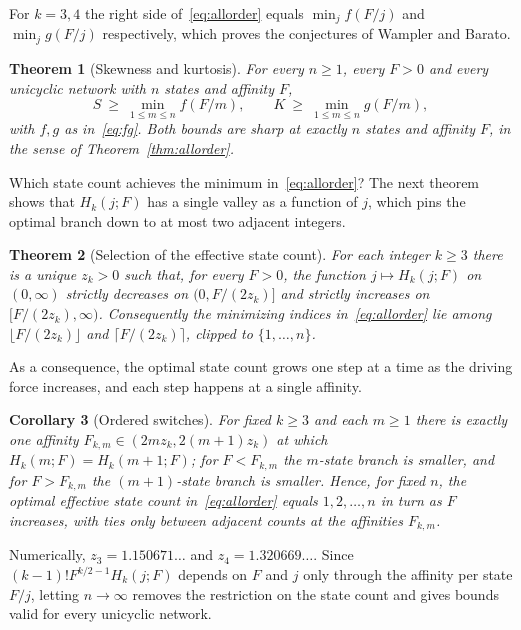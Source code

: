 \documentclass[11pt]{article}
\newtheorem{theorem}{Theorem}
\newtheorem{corollary}[theorem]{Corollary}
\theoremstyle{remark}
\begin{document}
For $k=3,4$ the right side of~\eqref{eq:allorder} equals
$\min_jf(F/j)$ and $\min_jg(F/j)$ respectively, which proves the
conjectures of Wampler and Barato.

\begin{theorem}[Skewness and kurtosis]\label{thm:main}
For every $n\ge1$, every $F>0$ and every unicyclic network with $n$ states
and affinity $F$,
\[
S\ \ge\ \min_{1\le m\le n}f(F/m),\qquad K\ \ge\ \min_{1\le m\le n}g(F/m),
\]
with $f,g$ as in~\eqref{eq:fg}. Both bounds are sharp at exactly $n$ states
and affinity $F$, in the sense of Theorem~\ref{thm:allorder}.
\end{theorem}

Which state count achieves the minimum in~\eqref{eq:allorder}? The next
theorem shows that $H_k(j;F)$ has a single valley as a function of $j$,
which pins the optimal branch down to at most two adjacent integers.

\begin{theorem}[Selection of the effective state count]\label{thm:selector}
For each integer $k\ge3$ there is a unique $z_k>0$ such that, for every
$F>0$, the function $j\mapsto H_k(j;F)$ on $(0,\infty)$ strictly decreases on
$(0,F/(2z_k)]$ and strictly increases on $[F/(2z_k),\infty)$. Consequently
the minimizing indices in~\eqref{eq:allorder} lie among
$\lfloor F/(2z_k)\rfloor$ and $\lceil F/(2z_k)\rceil$, clipped to
$\{1,\dots,n\}$.
\end{theorem}

As a consequence, the optimal state count grows one step at a time as the
driving force increases, and each step happens at a single affinity.

\begin{corollary}[Ordered switches]\label{cor:switch}
For fixed $k\ge3$ and each $m\ge1$ there is exactly one affinity
$F_{k,m}\in(2mz_k,2(m+1)z_k)$ at which $H_k(m;F)=H_k(m+1;F)$; for
$F<F_{k,m}$ the $m$-state branch is smaller, and for $F>F_{k,m}$ the
$(m+1)$-state branch is smaller. Hence, for fixed $n$, the optimal effective
state count in~\eqref{eq:allorder} equals $1,2,\dots,n$ in turn as $F$
increases, with ties only between adjacent counts at the affinities
$F_{k,m}$.
\end{corollary}

Numerically, $z_3=1.150671\ldots$ and $z_4=1.320669\ldots$. Since
$(k-1)!F^{k/2-1}H_k(j;F)$ depends on $F$ and $j$ only through the affinity
per state $F/j$, letting $n\to\infty$ removes the restriction on the state
count and gives bounds valid for every unicyclic network.
\end{document}
